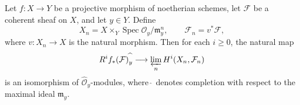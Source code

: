 Let $f: X \to Y$ be a projective morphism of noetherian schemes, let $\mathcal{F}$ be a coherent sheaf on $X$, and let $y \in Y$. Define
$$
X_n = X \times_Y \operatorname{Spec} \mathcal{O}_y / \mathfrak{m}_y^n, \qquad \mathcal{F}_n = v^*\mathcal{F},
$$
where $v: X_n \to X$ is the natural morphism. Then for each $i \geqslant 0$, the natural map
$$
R^i f_*(\mathcal{F})_y^{\widehat{\ }} \longrightarrow \varprojlim_{n} H^i(X_n, \mathcal{F}_n)
$$
is an isomorphism of $\widehat{\mathcal{O}}_y$-modules, where $\widehat{\ }$ denotes completion with respect to the maximal ideal $\mathfrak{m}_y$.
